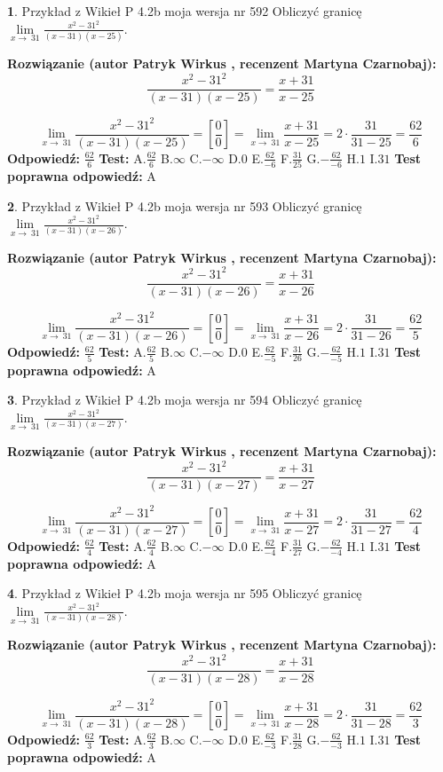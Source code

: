 \documentclass[12pt, a4paper]{article}
\theoremstyle{definition} %
\newtheorem{zad}{}
\newcommand{\zadStart}[1]{\begin{zad}#1\newline}
\newcommand{\zadStop}{\end{zad}}
\newcommand{\rozwStart}[2]{\noindent \textbf{Rozwiązanie (autor #1 , recenzent #2): }\newline}
\newcommand{\rozwStop}{\newline}
\newcommand{\odpStart}{\noindent \textbf{Odpowiedź:}\newline}
\newcommand{\odpStop}{\newline}
\newcommand{\testStart}{\noindent \textbf{Test:}\newline}
\newcommand{\testStop}{\newline}
\newcommand{\kluczStart}{\noindent \textbf{Test poprawna odpowiedź:}\newline}
\newcommand{\kluczStop}{\newline}
\begin{document}
\zadStart{Przykład z Wikieł P 4.2b moja wersja nr 592}
Obliczyć granicę $\lim\limits_{x\to\ 31}\frac{x^{2}-31^{2}}{(x-31)(x-25)}$.
\zadStop
\rozwStart{Patryk Wirkus}{Martyna Czarnobaj}
$$\frac{x^{2}-31^{2}}{(x-31)(x-25)}=\frac{x+31}{x-25}$$

$$\lim\limits_{x\to\ 31}\frac{x^{2}-31^{2}}{(x-31)(x-25)}=[\frac{0}{0}]=\lim\limits_{x\to\ 31}\frac{x+31}{x-25}=2 \cdot \frac{31}{31-25} = \frac{62}{6}$$
\rozwStop
\odpStart
$\frac{62}{6}$
\odpStop
\testStart
A.$\frac{62}{6}$
B.$\infty$
C.$-\infty$
D.$0$
E.$\frac{62}{-6}$
F.$\frac{31}{25}$
G.$-\frac{62}{-6}$
H.$1$
I.$31$
\testStop
\kluczStart
A
\kluczStop



\zadStart{Przykład z Wikieł P 4.2b moja wersja nr 593}
Obliczyć granicę $\lim\limits_{x\to\ 31}\frac{x^{2}-31^{2}}{(x-31)(x-26)}$.
\zadStop
\rozwStart{Patryk Wirkus}{Martyna Czarnobaj}
$$\frac{x^{2}-31^{2}}{(x-31)(x-26)}=\frac{x+31}{x-26}$$

$$\lim\limits_{x\to\ 31}\frac{x^{2}-31^{2}}{(x-31)(x-26)}=[\frac{0}{0}]=\lim\limits_{x\to\ 31}\frac{x+31}{x-26}=2 \cdot \frac{31}{31-26} = \frac{62}{5}$$
\rozwStop
\odpStart
$\frac{62}{5}$
\odpStop
\testStart
A.$\frac{62}{5}$
B.$\infty$
C.$-\infty$
D.$0$
E.$\frac{62}{-5}$
F.$\frac{31}{26}$
G.$-\frac{62}{-5}$
H.$1$
I.$31$
\testStop
\kluczStart
A
\kluczStop



\zadStart{Przykład z Wikieł P 4.2b moja wersja nr 594}
Obliczyć granicę $\lim\limits_{x\to\ 31}\frac{x^{2}-31^{2}}{(x-31)(x-27)}$.
\zadStop
\rozwStart{Patryk Wirkus}{Martyna Czarnobaj}
$$\frac{x^{2}-31^{2}}{(x-31)(x-27)}=\frac{x+31}{x-27}$$

$$\lim\limits_{x\to\ 31}\frac{x^{2}-31^{2}}{(x-31)(x-27)}=[\frac{0}{0}]=\lim\limits_{x\to\ 31}\frac{x+31}{x-27}=2 \cdot \frac{31}{31-27} = \frac{62}{4}$$
\rozwStop
\odpStart
$\frac{62}{4}$
\odpStop
\testStart
A.$\frac{62}{4}$
B.$\infty$
C.$-\infty$
D.$0$
E.$\frac{62}{-4}$
F.$\frac{31}{27}$
G.$-\frac{62}{-4}$
H.$1$
I.$31$
\testStop
\kluczStart
A
\kluczStop



\zadStart{Przykład z Wikieł P 4.2b moja wersja nr 595}
Obliczyć granicę $\lim\limits_{x\to\ 31}\frac{x^{2}-31^{2}}{(x-31)(x-28)}$.
\zadStop
\rozwStart{Patryk Wirkus}{Martyna Czarnobaj}
$$\frac{x^{2}-31^{2}}{(x-31)(x-28)}=\frac{x+31}{x-28}$$

$$\lim\limits_{x\to\ 31}\frac{x^{2}-31^{2}}{(x-31)(x-28)}=[\frac{0}{0}]=\lim\limits_{x\to\ 31}\frac{x+31}{x-28}=2 \cdot \frac{31}{31-28} = \frac{62}{3}$$
\rozwStop
\odpStart
$\frac{62}{3}$
\odpStop
\testStart
A.$\frac{62}{3}$
B.$\infty$
C.$-\infty$
D.$0$
E.$\frac{62}{-3}$
F.$\frac{31}{28}$
G.$-\frac{62}{-3}$
H.$1$
I.$31$
\testStop
\kluczStart
A
\kluczStop
\end{document}
